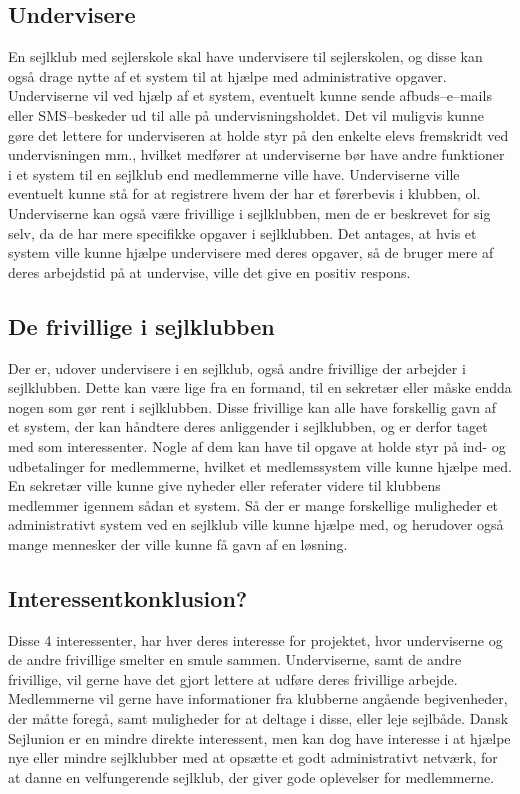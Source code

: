 \subsection{Undervisere}

En sejlklub med sejlerskole skal have undervisere til sejlerskolen, og disse kan også drage nytte af et system
til at hjælpe med administrative opgaver. Underviserne vil ved hjælp af et system, eventuelt kunne sende
afbuds--e--mails eller SMS--beskeder ud til alle på undervisningsholdet. Det vil muligvis kunne gøre det lettere
for underviseren at holde styr på den enkelte elevs fremskridt ved undervisningen mm., hvilket medfører at
underviserne bør have andre funktioner i et system til en sejlklub end medlemmerne ville have. Underviserne
ville eventuelt kunne stå for at registrere hvem der har et førerbevis i klubben, ol. Underviserne kan også
være frivillige i sejlklubben, men de er beskrevet for sig selv, da de har mere specifikke opgaver i
sejlklubben. Det antages, at hvis et system ville kunne hjælpe undervisere med deres opgaver, så de bruger
mere af deres arbejdstid på at undervise, ville det give en positiv respons.


\subsection{De frivillige i sejlklubben}

Der er, udover undervisere i en sejlklub, også andre frivillige der arbejder i sejlklubben. Dette kan være
lige fra en formand, til en sekretær eller måske endda nogen som gør rent i sejlklubben. Disse frivillige kan
alle have forskellig gavn af et system, der kan håndtere deres anliggender i sejlklubben, og er derfor taget
med som interessenter. Nogle af dem kan have til opgave at holde styr på ind- og udbetalinger for medlemmerne,
hvilket et medlemssystem ville kunne hjælpe med. En sekretær ville kunne give nyheder eller referater videre
til klubbens medlemmer igennem sådan et system. Så der er mange forskellige muligheder et administrativt
system ved en sejlklub ville kunne hjælpe med, og herudover også mange mennesker der ville kunne få gavn af en
løsning.


\subsection{Interessentkonklusion?} 

Disse 4 interessenter, har hver deres interesse for projektet, hvor underviserne og de andre frivillige
smelter en smule sammen. Underviserne, samt de andre frivillige, vil gerne have det gjort lettere at udføre
deres frivillige arbejde. Medlemmerne vil gerne have informationer fra klubberne angående begivenheder, der
måtte foregå, samt muligheder for at deltage i disse, eller leje sejlbåde. Dansk Sejlunion er en mindre
direkte interessent, men kan dog have interesse i at hjælpe nye eller mindre sejlklubber med at opsætte et
godt administrativt netværk, for at danne en velfungerende sejlklub, der giver gode oplevelser for
medlemmerne.

